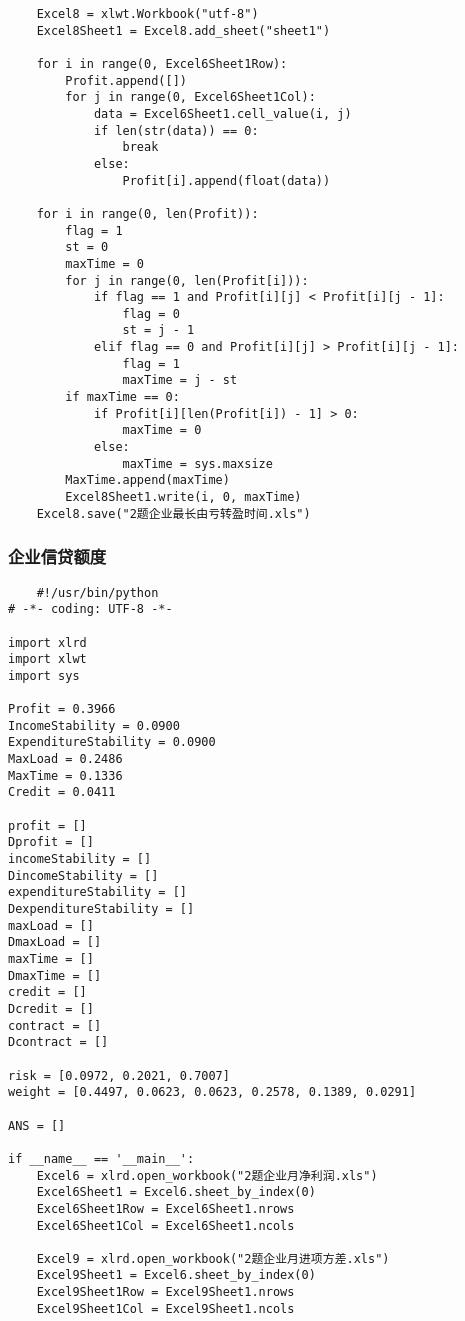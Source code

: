 \documentclass[dvipsnames,withoutpreface,bwprint]{cumcmthesis}
\begin{document}
\begin{appendices}
\begin{lstlisting}
    Excel8 = xlwt.Workbook("utf-8")
    Excel8Sheet1 = Excel8.add_sheet("sheet1")

    for i in range(0, Excel6Sheet1Row):
        Profit.append([])
        for j in range(0, Excel6Sheet1Col):
            data = Excel6Sheet1.cell_value(i, j)
            if len(str(data)) == 0:
                break
            else:
                Profit[i].append(float(data))

    for i in range(0, len(Profit)):
        flag = 1
        st = 0
        maxTime = 0
        for j in range(0, len(Profit[i])):
            if flag == 1 and Profit[i][j] < Profit[i][j - 1]:
                flag = 0
                st = j - 1
            elif flag == 0 and Profit[i][j] > Profit[i][j - 1]:
                flag = 1
                maxTime = j - st
        if maxTime == 0:
            if Profit[i][len(Profit[i]) - 1] > 0:
                maxTime = 0
            else:
                maxTime = sys.maxsize
        MaxTime.append(maxTime)
        Excel8Sheet1.write(i, 0, maxTime)
    Excel8.save("2题企业最长由亏转盈时间.xls")
\end{lstlisting}
\subsubsection{企业信贷额度}
\begin{lstlisting}
    #!/usr/bin/python
# -*- coding: UTF-8 -*-

import xlrd
import xlwt
import sys

Profit = 0.3966
IncomeStability = 0.0900
ExpenditureStability = 0.0900
MaxLoad = 0.2486
MaxTime = 0.1336
Credit = 0.0411

profit = []
Dprofit = []
incomeStability = []
DincomeStability = []
expenditureStability = []
DexpenditureStability = []
maxLoad = []
DmaxLoad = []
maxTime = []
DmaxTime = []
credit = []
Dcredit = []
contract = []
Dcontract = []

risk = [0.0972, 0.2021, 0.7007]
weight = [0.4497, 0.0623, 0.0623, 0.2578, 0.1389, 0.0291]

ANS = []

if __name__ == '__main__':
    Excel6 = xlrd.open_workbook("2题企业月净利润.xls")
    Excel6Sheet1 = Excel6.sheet_by_index(0)
    Excel6Sheet1Row = Excel6Sheet1.nrows
    Excel6Sheet1Col = Excel6Sheet1.ncols

    Excel9 = xlrd.open_workbook("2题企业月进项方差.xls")
    Excel9Sheet1 = Excel6.sheet_by_index(0)
    Excel9Sheet1Row = Excel9Sheet1.nrows
    Excel9Sheet1Col = Excel9Sheet1.ncols


\end{lstlisting}
\end{appendices}
\end{document}
